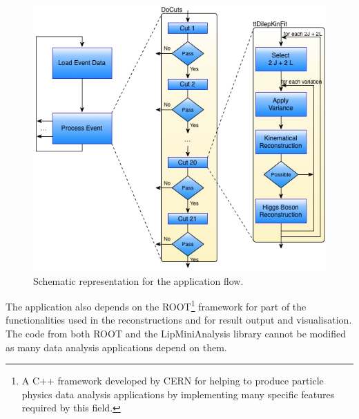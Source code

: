 \begin{figure}[!htp]
	\begin{center}
		\includegraphics[scale=0.5]{images/graf_abstract_flow_with_kinfit.png}
		\caption{Schematic representation for the \tth application flow.}
		\label{fig:flow}
	\end{center}
\end{figure}

The application also depends on the ROOT\footnote{A C++ framework developed by CERN for helping to produce particle physics data analysis applications by implementing many specific features required by this field.} framework for part of the functionalities used in the reconstructions and for result output and visualisation. The code from both ROOT and the LipMiniAnalysis library cannot be modified as many data analysis applications depend on them.
